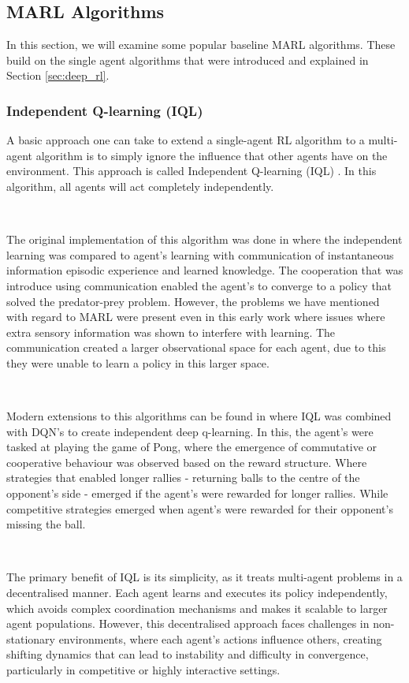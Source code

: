 \documentclass{article}
\begin{document}
\subsection{MARL Algorithms}

In this section, we will examine some popular baseline MARL algorithms. These build on the single agent algorithms that were introduced and explained in Section \ref{sec:deep_rl}. 

\subsubsection{Independent Q-learning (IQL)}

A basic approach one can take to extend a single-agent RL algorithm to a multi-agent algorithm is to simply ignore the influence that other agents have on the environment. This approach is called Independent Q-learning (IQL) \citep{tan1997MultiAgentRL}. In this algorithm, all agents will act completely independently.

\

The original implementation of this algorithm was done in \citet{tan1997MultiAgentRL} where the independent learning was compared to agent's learning with communication of instantaneous information episodic experience and learned knowledge. The cooperation that was introduce using communication enabled the agent's to converge to a policy that solved the predator-prey problem. However, the problems we have mentioned with regard to MARL were present even in this early work where issues where extra sensory information was shown to interfere with learning. The communication created a larger observational space for each agent, due to this they were unable to learn a policy in this larger space. \citep{tampuu2015multiagent}

\

Modern extensions to this algorithms can be found in \citet{tampuu2015multiagent} where IQL was combined with DQN's to create independent deep q-learning. In this, the agent's were tasked at playing the game of Pong, where the emergence of commutative or cooperative behaviour was observed based on the reward structure. Where strategies that enabled longer rallies - returning balls to the centre of the opponent's side - emerged if the agent's were rewarded for longer rallies. While competitive strategies emerged when agent's were rewarded for their opponent's missing the ball.

\

The primary benefit of IQL is its simplicity, as it treats multi-agent problems in a decentralised manner. Each agent learns and executes its policy independently, which avoids complex coordination mechanisms and makes it scalable to larger agent populations. However, this decentralised approach faces challenges in non-stationary environments, where each agent's actions influence others, creating shifting dynamics that can lead to instability and difficulty in convergence, particularly in competitive or highly interactive settings.
\end{document}
